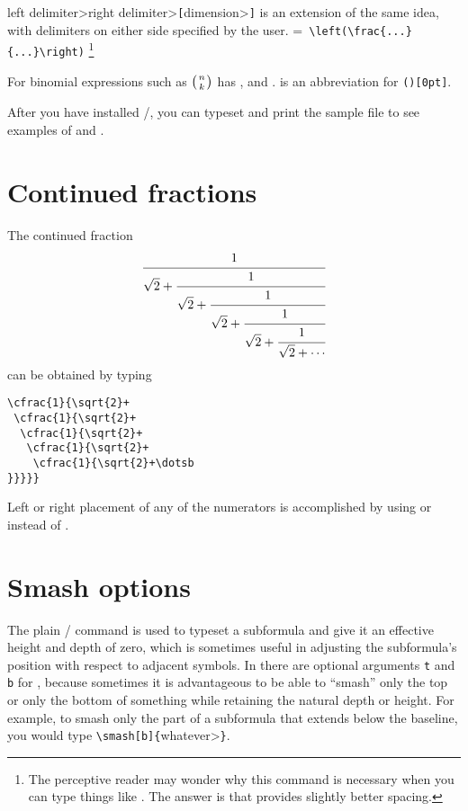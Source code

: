 \5\<left delimiter>\5\<right
delimiter>\5\verb"["\<dimension>\verb"]" is an extension of the same idea,
with delimiters on either side specified by the user.%
=\hbox{\footnotesize
\verb"\left"\5\verb"(\frac"\5\verb"{...}"\5\verb"{...}"\5\verb"\right)"}%
\footnote{The perceptive reader may wonder why this command is necessary
when you can type things like .
The answer is that  provides slightly better
spacing.}

For binomial expressions such as $\bigl({n\atop k}\bigr)$
 has ,  and .   is
an abbreviation for \verb"()[0pt]".

After you have installed \amslatex/, you can
typeset and print the sample file  to see
examples of  and .

\section{Continued fractions}
The continued fraction
\begin{equation}
\def\cfrac#1#2{{\displaystyle\strut#1\over\displaystyle#2}%
 \kern-\nulldelimiterspace}
\cfrac{1}{\sqrt{2}+
 \cfrac{1}{\sqrt{2}+
  \cfrac{1}{\sqrt{2}+
   \cfrac{1}{\sqrt{2}+
    \cfrac{1}{\sqrt{2}+\cdots
}}}}}
\end{equation}
can be obtained by typing
{\samepage
\begin{verbatim}
\cfrac{1}{\sqrt{2}+
 \cfrac{1}{\sqrt{2}+
  \cfrac{1}{\sqrt{2}+
   \cfrac{1}{\sqrt{2}+
    \cfrac{1}{\sqrt{2}+\dotsb
}}}}}
\end{verbatim}
}Left or right placement of any of the numerators is accomplished by using
 or  instead of .

\section{Smash options}

The plain \tex/ command  is used to typeset a subformula and
give it an effective height and depth of zero, which is sometimes
useful in adjusting the subformula's position with respect to adjacent
symbols.   In  there are optional arguments \verb"t" and
\verb"b" for , because sometimes it is advantageous to be
able to ``smash'' only the top or only the bottom of something while
retaining the natural depth or height.  For example, to smash only the
part of a subformula that extends below the baseline, you would type
\verb"\smash[b]{"\5\<whatever>\5\verb"}".


